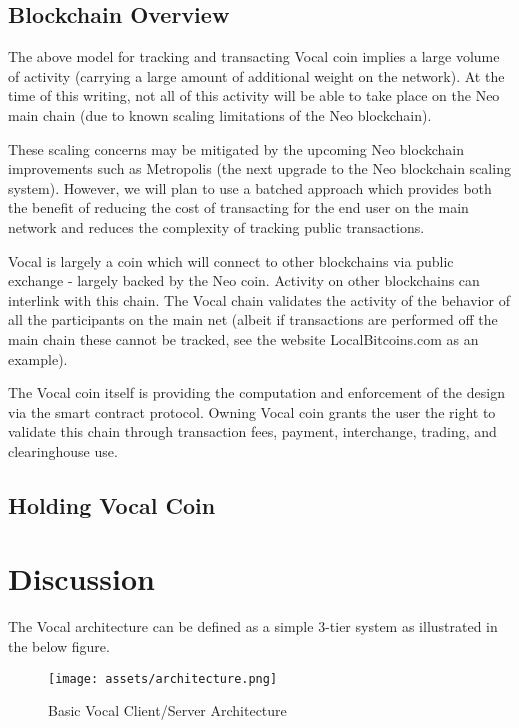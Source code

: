 \documentclass[conference]{IEEEtran}
\begin{document}
    \subsection{Blockchain Overview}

    The above model for tracking and transacting Vocal coin implies a large volume of activity (carrying a large amount of additional weight on the network). At the time of this writing, not all of this activity will be able to take place on the Neo main chain (due to known scaling limitations of the Neo blockchain).


    These scaling concerns may be mitigated by the upcoming Neo blockchain improvements such as Metropolis (the next upgrade to the Neo blockchain scaling system). However, we will plan to use a batched approach which provides both the benefit of reducing the cost of transacting for the end user on the main network and reduces the complexity of tracking public transactions.

   Vocal is largely a coin which will connect to other blockchains via public exchange - largely backed by the Neo coin. Activity on other blockchains can interlink with this chain. The Vocal chain validates the activity of the behavior of all the participants on the main net (albeit if transactions are performed off the main chain these cannot be tracked, see the website LocalBitcoins.com as an example).

    The Vocal coin itself is providing the computation and enforcement of the design via the smart contract protocol. Owning Vocal coin grants the user the right to validate this chain through transaction fees, payment, interchange, trading, and clearinghouse use. 

    \subsection{Holding Vocal Coin}

    \section{Discussion}

    The Vocal architecture can be defined as a simple 3-tier system as illustrated in the below figure.

    \begin{figure}[t]
      \texttt{[image: assets/architecture.png]}
      \caption{Basic Vocal Client/Server Architecture}
      \centering
    \end{figure}
\end{document}
